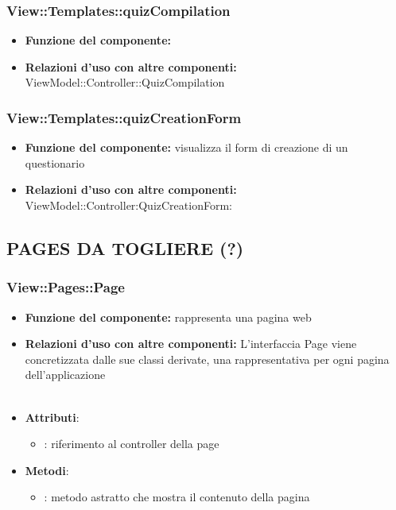 \subsubsection{View::Templates::quizCompilation}
\begin{itemize}
\item\textbf{Funzione del componente:} \\
\item\textbf{Relazioni d'uso con altre componenti:} ViewModel::Controller::QuizCompilation\\
\end{itemize}
\subsubsection{View::Templates::quizCreationForm}
\begin{itemize}
\item\textbf{Funzione del componente:} visualizza il form di creazione di un questionario\\
\item\textbf{Relazioni d'uso con altre componenti:} ViewModel::Controller:QuizCreationForm:\\
\end{itemize}


\subsection{PAGES DA TOGLIERE (?)}



\subsubsection{View::Pages::Page}
\begin{itemize}
\item\textbf{Funzione del componente:} rappresenta una pagina web
				\item\textbf{Relazioni d'uso con altre componenti:} L'interfaccia Page viene concretizzata dalle sue classi derivate, una rappresentativa per ogni pagina dell'applicazione\\ \\
\item\textbf{Attributi}:
	\begin{itemize}
		\item{}: riferimento al controller della page\\
	\end{itemize}
\item\textbf{Metodi}:
	\begin{itemize}
		\item{}: metodo astratto che mostra il contenuto della pagina\\
	\end{itemize}
\end{itemize}

